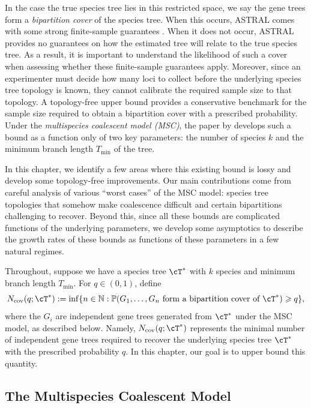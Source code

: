     In the case the true species tree lies in this restricted space, we say the gene trees form
    a \textit{bipartition cover} of the species tree. When this occurs, ASTRAL comes with some strong
    finite-sample guarantees \cite{shekhar2018_how_many_genes_are_enough}. When it does not occur,
    ASTRAL provides no guarantees on how the estimated tree will relate to the true species tree. As a result,
    it is important to understand the likelihood of such a cover when assessing whether these finite-sample guarantees apply.
    Moreover, since an experimenter must decide how many loci to collect before the underlying species
    tree topology is known, they cannot calibrate the required sample size to that topology. A topology-free upper bound
    provides a conservative benchmark for the sample size required to obtain a bipartition cover with a prescribed
    probability. Under the \emph{multispecies coalescent model (MSC)}, the paper by \citet{uricchio2016_bipartition_cover} develops
    such a bound as a function only of two key parameters: the number of species $k$ and the minimum
    branch length $T_{\mathrm{min}}$ of the tree.

    In this chapter, we identify a few areas where this existing bound
    is lossy and develop some topology-free improvements. Our main contributions come from careful analysis
    of various ``worst cases'' of the MSC model: species tree topologies that somehow make coalescence
    difficult and certain bipartitions challenging to recover. Beyond this, since all these bounds are
    complicated functions of the underlying parameters, we develop some asymptotics to describe
    the growth rates of these bounds as functions of these parameters in a few natural regimes.

Throughout, suppose we have a species tree $\cT^*$ with $k$ species and minimum branch
length $T_{\mathrm{min}}$. For $q\in(0,1)$, define
\[
N_{\mathrm{cov}}(q;\cT^*)
:=\inf\{n\in\N:\P(G_1,\ldots,G_n\text{ form a bipartition cover of }\cT^*)\geq q\},
\]
where the $G_i$ are independent gene trees generated from $\cT^*$ under
the MSC model, as described below. Namely, $N_{\mathrm{cov}}(q;\cT^*)$ represents the minimal number of
independent gene trees required to recover the underlying species tree $\cT^*$ with the
prescribed probability $q$. In this chapter, our goal is to upper bound this quantity.


\subsection{The Multispecies Coalescent Model}
\label{sec:multispecies-coalescent-model}

